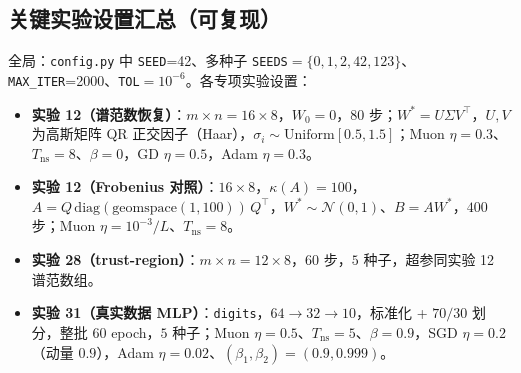 \subsection{关键实验设置汇总（可复现）}
\label{app:settings}

\noindent 全局：\texttt{config.py} 中 \texttt{SEED}=42、多种子 \texttt{SEEDS}$=\{0,1,2,42,123\}$、\texttt{MAX\_ITER}=2000、\texttt{TOL}$=10^{-6}$。各专项实验设置：
\begin{itemize}[nosep]
  \item \textbf{实验 12（谱范数恢复）}：$m\times n=16\times 8$，$W_0=0$，$80$ 步；$W^*=U\Sigma V^\top$，$U,V$ 为高斯矩阵 QR 正交因子（Haar），$\sigma_i\sim\mathrm{Uniform}[0.5,1.5]$；Muon $\eta=0.3$、$T_{\mathrm{ns}}=8$、$\beta=0$，GD $\eta=0.5$，Adam $\eta=0.3$。
  \item \textbf{实验 12（Frobenius 对照）}：$16\times 8$，$\kappa(A)=100$，$A=Q\,\mathrm{diag}(\mathrm{geomspace}(1,100))\,Q^\top$，$W^*\sim\mathcal N(0,1)$、$B=AW^*$，$400$ 步；Muon $\eta=10^{-3}/L$、$T_{\mathrm{ns}}=8$。
  \item \textbf{实验 28（trust-region）}：$m\times n=12\times 8$，$60$ 步，$5$ 种子，超参同实验 12 谱范数组。
  \item \textbf{实验 31（真实数据 MLP）}：\texttt{digits}，$64\!\to\!32\!\to\!10$，标准化 + $70/30$ 划分，整批 $60$ epoch，$5$ 种子；Muon $\eta=0.5$、$T_{\mathrm{ns}}=5$、$\beta=0.9$，SGD $\eta=0.2$（动量 $0.9$），Adam $\eta=0.02$、$(\beta_1,\beta_2)=(0.9,0.999)$。
\end{itemize}
